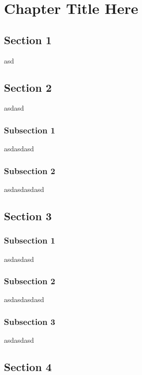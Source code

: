 \label{ChapterX} %
\chapter{Chapter Title Here}

\section{Section 1}
asd

\section{Section 2}
asdasd

\subsection{Subsection 1}
asdasdasd

\subsection{Subsection 2}
asdasdasdasd

\section{Section 3}

\subsection{Subsection 1}
asdasdasd

\subsection{Subsection 2}
asdasdasdasd

\subsection{Subsection 3}
asdasdasd

\section{Section 4}
